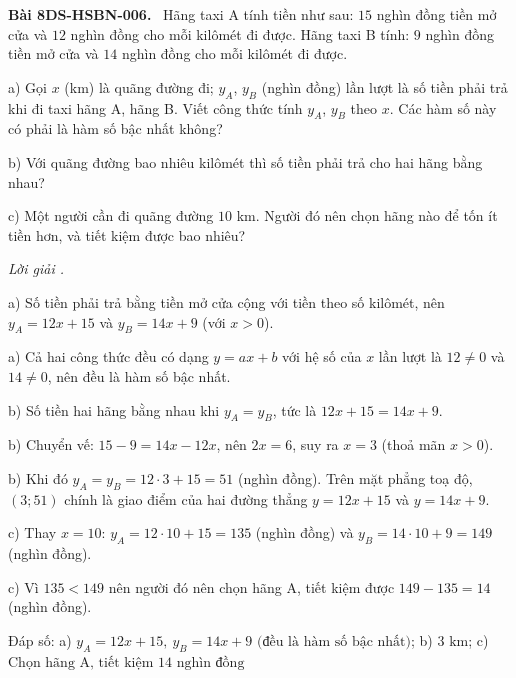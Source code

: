 \documentclass[12pt,a4paper]{article}
\newenvironment{problem}[1][]{\par\medskip\noindent\textbf{Bài #1.}\ }{\par}
\newenvironment{solution}[1][]{\par\noindent\textit{Lời giải #1.}\par}{\par}
\begin{document}
\begin{problem}[8DS-HSBN-006]
Hãng taxi A tính tiền như sau: $15$ nghìn đồng tiền mở cửa và $12$ nghìn đồng cho mỗi kilômét đi được. Hãng taxi B tính: $9$ nghìn đồng tiền mở cửa và $14$ nghìn đồng cho mỗi kilômét đi được.

a) Gọi $x$ (km) là quãng đường đi; $y_A$, $y_B$ (nghìn đồng) lần lượt là số tiền phải trả khi đi taxi hãng A, hãng B. Viết công thức tính $y_A$, $y_B$ theo $x$. Các hàm số này có phải là hàm số bậc nhất không?

b) Với quãng đường bao nhiêu kilômét thì số tiền phải trả cho hai hãng bằng nhau?

c) Một người cần đi quãng đường $10$ km. Người đó nên chọn hãng nào để tốn ít tiền hơn, và tiết kiệm được bao nhiêu?

\begin{solution}
a) Số tiền phải trả bằng tiền mở cửa cộng với tiền theo số kilômét, nên $y_A = 12x + 15$ và $y_B = 14x + 9$ (với $x > 0$).

a) Cả hai công thức đều có dạng $y = ax + b$ với hệ số của $x$ lần lượt là $12 \neq 0$ và $14 \neq 0$, nên đều là hàm số bậc nhất.

b) Số tiền hai hãng bằng nhau khi $y_A = y_B$, tức là $12x + 15 = 14x + 9$.

b) Chuyển vế: $15 - 9 = 14x - 12x$, nên $2x = 6$, suy ra $x = 3$ (thoả mãn $x > 0$).

b) Khi đó $y_A = y_B = 12 \cdot 3 + 15 = 51$ (nghìn đồng). Trên mặt phẳng toạ độ, $(3; 51)$ chính là giao điểm của hai đường thẳng $y = 12x + 15$ và $y = 14x + 9$.

c) Thay $x = 10$: $y_A = 12 \cdot 10 + 15 = 135$ (nghìn đồng) và $y_B = 14 \cdot 10 + 9 = 149$ (nghìn đồng).

c) Vì $135 < 149$ nên người đó nên chọn hãng A, tiết kiệm được $149 - 135 = 14$ (nghìn đồng).

Đáp số: a) $\boxed{y_A = 12x + 15,\ y_B = 14x + 9 \text{ (đều là hàm số bậc nhất)}}$; b) $\boxed{3 \text{ km}}$; c) $\boxed{\text{Chọn hãng A, tiết kiệm } 14 \text{ nghìn đồng}}$
\end{solution}
\end{problem}
\end{document}
